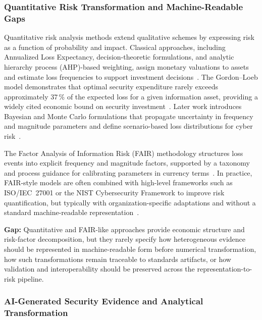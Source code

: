 \documentclass[preprint,12pt]{elsarticle}
\begin{document}
\subsubsection{Quantitative Risk Transformation and Machine-Readable Gaps}
\label{sec:quant-fair}

Quantitative risk analysis methods extend qualitative schemes by expressing risk as a function of probability and impact. Classical approaches, including Annualized Loss Expectancy, decision-theoretic formulations, and analytic hierarchy process (AHP)-based weighting, assign monetary valuations to assets and estimate loss frequencies to support investment decisions~\cite{Courtney1985NBS}. The Gordon--Loeb model demonstrates that optimal security expenditure rarely exceeds approximately $37\,\%$ of the expected loss for a given information asset, providing a widely cited economic bound on security investment~\cite{Gordon2002_SecInvest}. Later work introduces Bayesian and Monte Carlo formulations that propagate uncertainty in frequency and magnitude parameters and define scenario-based loss distributions for cyber risk~\cite{Radanliev2020}.

The Factor Analysis of Information Risk (FAIR) methodology structures loss events into explicit frequency and magnitude factors, supported by a taxonomy and process guidance for calibrating parameters in currency terms~\cite{FAIR}. In practice, FAIR-style models are often combined with high-level frameworks such as ISO/IEC~27001 or the NIST Cybersecurity Framework to improve risk quantification, but typically with organization-specific adaptations and without a standard machine-readable representation~\cite{ParenteEtAl2025_JISA_FRAPE,KhalilEtAl2025_JISA_CyberROAD}.

\noindent\textbf{Gap:} Quantitative and FAIR-like approaches provide economic structure and risk-factor decomposition, but they rarely specify how heterogeneous evidence should be represented in machine-readable form before numerical transformation, how such transformations remain traceable to standards artifacts, or how validation and interoperability should be preserved across the representation-to-risk pipeline.

\subsubsection{AI-Generated Security Evidence and Analytical Transformation}
\label{sec:ai-ids}
\end{document}
